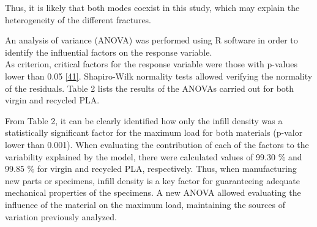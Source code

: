 \documentclass[conference,final,]{IEEEtran}
\begin{document}
Thus, it is likely that both modes coexist in this study, which may
explain the heterogeneity of the different fractures.

An analysis of variance (ANOVA) was performed using R software in order
to identify the influential factors on the response variable.\\
As criterion, critical factors for the response variable were those with
p-values lower than 0.05 \protect\hyperlink{ref-Perez2018}{{[}41{]}}.
Shapiro-Wilk normality tests allowed verifying the normality of the
residuals. Table 2 lists the results of the ANOVAs carried out for both
virgin and recycled PLA.

\begin{table}

\caption{\label{tab:Table.Anova.fase1}ANOVA results at 95\% significance level}
\centering
{}
\end{table}

From Table 2, it can be clearly identified how only the infill density
was a statistically significant factor for the maximum load for both
materials (p-valor lower than 0.001). When evaluating the contribution
of each of the factors to the variability explained by the model, there
were calculated values of 99.30 \% and 99.85 \% for virgin and recycled
PLA, respectively. Thus, when manufacturing new parts or specimens,
infill density is a key factor for guaranteeing adequate mechanical
properties of the specimens. A new ANOVA allowed evaluating the
influence of the material on the maximum load, maintaining the sources
of variation previously analyzed.
\end{document}
